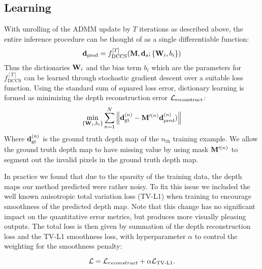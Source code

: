 \subsection{Learning}
\label{sec:dictionary-learning}

With unrolling of the ADMM update by $T$ iterations as described above, the entire inference procedure can be thought of as a single differentiable function:
\begin{equation}
    \mathbf{d}_\text{pred} = f_\text{DCCS}^{[T]}(\mathbf{M}, \mathbf{d}_s; \{\mathbf{W}_i, b_i\})
\end{equation}
Thus the dictionaries $\mathbf{W}_i$ and the bias term $b_i$ which are the parameters for $f_\text{DCCS}^{[T]}$ can be learned through  stochastic gradient descent over a suitable loss function. Using the standard sum of squared loss error, dictionary learning is formed as minimizing the depth reconstruction error $\mathcal{L}_\text{reconstruct}$:
\begin{equation}
  \label{eq:9}
  \min_{\{\mathbf{W}_i, b_i\}} \sum_{n=1}^{N}\left\Vert \mathbf{d}_\text{gt}^{(n)} - \mathbf{M}'^{(n)}  \mathbf{d}_\text{pred}^{(n)})\right\Vert
\end{equation}
Where $\mathbf{d}_\text{gt}^{(n)}$ is the ground truth depth map of the $n_\text{th}$ training example. We allow the ground truth depth map to have missing value by using mask $\mathbf{M}'^{(n)}$ to segment out the invalid pixels in the ground truth depth map. 

In practice we found that due to the sparsity of the training data, the depth maps our method predicted were rather noisy. To fix this issue we included the well known anisotropic total variation loss (TV-L1) when training to encourage smoothness of the predicted depth map. Note that this change has no significant impact on the quantitative error metrics, but produces more visually pleasing outputs. The total loss is then given by summation of the depth reconstruction loss and the TV-L1 smoothness loss, with hyperparameter $\alpha$ to control the weighting for the smoothness penalty:

\begin{equation}
  \label{eq:9}
  \mathcal{L} = \mathcal{L}_{reconstruct} + \alpha \mathcal{L}_\text{TV-L1}.
\end{equation}


